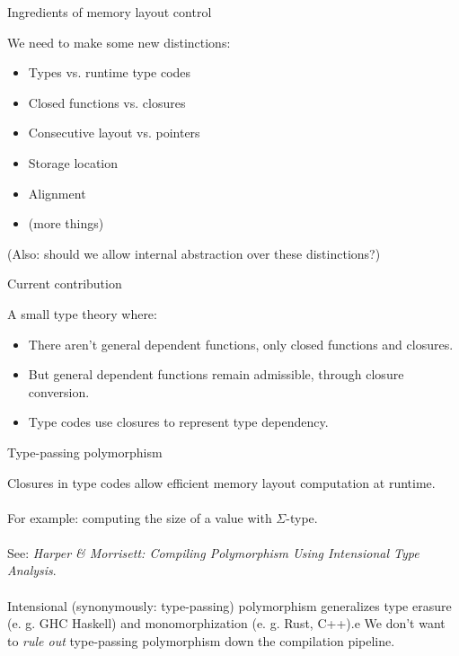 \documentclass{beamer}
\begin{document}
\begin{frame}{Ingredients of memory layout control}

  We need to make some new distinctions:

  \begin{itemize}
  \item {\color{red} Types vs. runtime type codes}
  \item {\color{red} Closed functions vs. closures}
  \item Consecutive layout vs. pointers
  \item Storage location
  \item Alignment
  \item (more things)
  \end{itemize}
(Also: should we allow internal abstraction over these distinctions?)
\end{frame}

\begin{frame}{Current contribution}

  A small type theory where:
  \begin{itemize}
  \item There aren't general dependent functions, only closed functions and closures.
  \item But general dependent functions remain admissible, through closure conversion.
  \item Type codes use closures to represent type dependency.
  \end{itemize}
\end{frame}


\begin{frame}{Type-passing polymorphism}

  Closures in type codes allow efficient memory layout computation at runtime.\\~\\
  For example: computing the size of a value with $\Sigma$-type. \\~\\
  See: \emph{Harper \& Morrisett: Compiling Polymorphism Using Intensional Type Analysis}. \\~\\
  Intensional (synonymously: type-passing) polymorphism generalizes type erasure (e. g. GHC Haskell) and monomorphization (e. g. Rust, C++).e
  We don't want to \emph{rule out} type-passing polymorphism down the compilation pipeline.

\end{frame}
\end{document}
